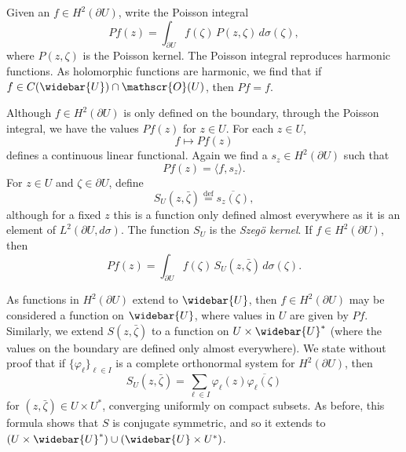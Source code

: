 \documentclass[12pt,openany]{book}
\newcommand{\linnprod}[2]{\langle #1 , #2 \rangle}
\newcommand{\sO}{{\mathscr{O}}}
\newcommand{\myindex}[1]{#1\index{#1}}
\theoremstyle{plain}
\theoremstyle{remark}
\theoremstyle{definition}
\theoremstyle{exercise}
\theoremstyle{example}
\begin{document}
Given an $f \in H^2(\partial U)$, write the Poisson integral
\begin{equation*}
Pf(z) = \int_{\partial U} f(\zeta) \, P(z,\zeta) \, d \sigma(\zeta) ,
\end{equation*}
where $P(z,\zeta)$ is the Poisson kernel.  The Poisson integral
reproduces harmonic functions.  As holomorphic functions are harmonic, we
find that if $f \in C(\widebar{U}) \cap \sO(U)$, then $Pf = f$.

Although $f \in H^2(\partial U)$ is only defined on the boundary,
through the Poisson integral, we have the values
$Pf(z)$ for $z \in U$.
For each $z \in U$,
\begin{equation*}
f \mapsto Pf(z)
\end{equation*}
defines a continuous linear functional.  Again we find a $s_z \in
H^2(\partial U)$ such that
\begin{equation*}
Pf(z) = \linnprod{f}{s_z} .
\end{equation*}
For $z \in U$ and $\zeta \in \partial U$, define
%
\begin{equation*}
S_U(z,\bar{\zeta}) \overset{\text{def}}{=} \overline{s_z(\zeta)} ,
\end{equation*}
although for a fixed $z$ this is a function only defined almost everywhere
as it is an element of $L^2(\partial U,d\sigma)$.
The function $S_U$ is the \emph{\myindex{Szeg{\"o} kernel}}.
If $f \in H^2(\partial U)$, then
\begin{equation*}
Pf(z) = \int_{\partial U} f(\zeta) \, S_U(z,\bar{\zeta}) \, d\sigma(\zeta) .
\end{equation*}

As functions in $H^2(\partial U)$ extend to $\widebar{U}$, then
$f \in H^2(\partial U)$ may be considered a function on
$\widebar{U}$, where values in $U$ are given by $Pf$.  Similarly, we
extend $S(z,\bar{\zeta})$ to a function on $U \times \widebar{U}^*$ (where
the values on the boundary are defined only almost everywhere).
We state without proof that if $\{ \varphi_\ell \}_{\ell\in I}$ is a complete
orthonormal system for $H^2(\partial U)$, then
\begin{equation} \label{eq:formulaszego}
S_U(z,\bar{\zeta}) = \sum_{\ell \in I} \varphi_\ell(z)\overline{\varphi_\ell(\zeta)}
\end{equation}
for $(z,\bar{\zeta}) \in U \times U^*$, converging uniformly on compact subsets.
As before, this formula shows that $S$ is conjugate symmetric,
and so it extends to
$(U \times \widebar{U}^*) \cup (\widebar{U} \times U^*)$.
\end{document}
